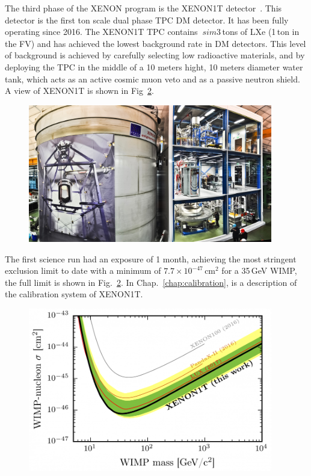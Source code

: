 The third phase of the XENON program is the XENON1T detector~\cite{Aprile:2017aty}. This detector is the first ton scale dual phase TPC  DM detector. It has been fully operating since 2016. The XENON1T TPC contains $~sim 3$\,tons of LXe (1\,ton in the FV) and has achieved the lowest background rate in DM detectors. This level of background is achieved by carefully selecting low radioactive materials, and by deploying the TPC in the middle of a 10 meters hight, 10 meters diameter water tank, which acts as an active cosmic muon veto and as a passive neutron shield. A view of XENON1T is shown in Fig~\ref{fig:xe1tLim}.

\begin{figure}[]
	\centering
	\includegraphics[width=0.95\textwidth]{figs/xe1tImg.png}
	\label{fig:xe1tLim}
\end{figure}

The first science run had an exposure of 1 month, achieving the most stringent  exclusion limit to date with a minimum of $7.7\times10^{-47}$\,cm$^2$ for a 35\,GeV WIMP, the full limit is shown in Fig.~\ref{fig:xe1tLim}. In Chap.~\ref{chap:calibration}, is a description of the calibration system of XENON1T.
 
\begin{figure}[]
	\centering
	\includegraphics[width=0.95\textwidth]{figs/xe1tLimit.png}
	\label{fig:xe1tLim}
\end{figure}


